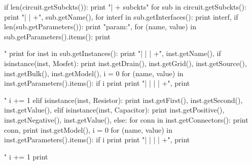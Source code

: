 \begin{DoxyCodeInclude}
{{  \textcolor{keywordflow}{if} len(circuit.getSubckts()):
    \textcolor{keywordflow}{print} \textcolor{stringliteral}{"| + subckts"}
    \textcolor{keywordflow}{for} sub \textcolor{keywordflow}{in} circuit.getSubckts():
      \textcolor{keywordflow}{print} \textcolor{stringliteral}{"| | +"}, sub.getName(),
      \textcolor{keywordflow}{for} interf \textcolor{keywordflow}{in} sub.getInterfaces():
        \textcolor{keywordflow}{print} interf,
      \textcolor{keywordflow}{if} len(sub.getParameters()):
          \textcolor{keywordflow}{print} \textcolor{stringliteral}{"param:"},
          \textcolor{keywordflow}{for} (name, value) \textcolor{keywordflow}{in} sub.getParameters().items():
            \textcolor{keywordflow}{print} \textcolor{stringliteral}{"%
      \textcolor{keywordflow}{print}
      \textcolor{keywordflow}{for} inst \textcolor{keywordflow}{in} sub.getInstances():
          \textcolor{keywordflow}{print} \textcolor{stringliteral}{"| | | +"}, inst.getName(),
          \textcolor{keywordflow}{if} isinstance(inst, Mosfet):
            \textcolor{keywordflow}{print} inst.getDrain(), inst.getGrid(), inst.getSource(), inst.getBulk(), inst.getModel(),
            i = 0
            \textcolor{keywordflow}{for} (name, value) \textcolor{keywordflow}{in} inst.getParameters().items():
              \textcolor{keywordflow}{if} i%
                \textcolor{keywordflow}{print} 
                \textcolor{keywordflow}{print} \textcolor{stringliteral}{"| | | | +"},
              \textcolor{keywordflow}{print} \textcolor{stringliteral}{"%
              i += 1
          \textcolor{keywordflow}{elif} isinstance(inst, Resistor):
            \textcolor{keywordflow}{print} inst.getFirst(), inst.getSecond(), inst.getValue(),
          \textcolor{keywordflow}{elif} isinstance(inst, Capacitor):
            \textcolor{keywordflow}{print} inst.getPositive(), inst.getNegative(), inst.getValue(),
          \textcolor{keywordflow}{else}:
            \textcolor{keywordflow}{for} conn \textcolor{keywordflow}{in} inst.getConnectors():
              \textcolor{keywordflow}{print} conn,
            \textcolor{keywordflow}{print} inst.getModel(),
            i = 0
            \textcolor{keywordflow}{for} (name, value) \textcolor{keywordflow}{in} inst.getParameters().items():
              \textcolor{keywordflow}{if} i%
                \textcolor{keywordflow}{print} 
                \textcolor{keywordflow}{print} \textcolor{stringliteral}{"| | | | +"},
              \textcolor{keywordflow}{print} \textcolor{stringliteral}{"%
              i += 1
          \textcolor{keywordflow}{print}

}}}}}
\end{DoxyCodeInclude}
